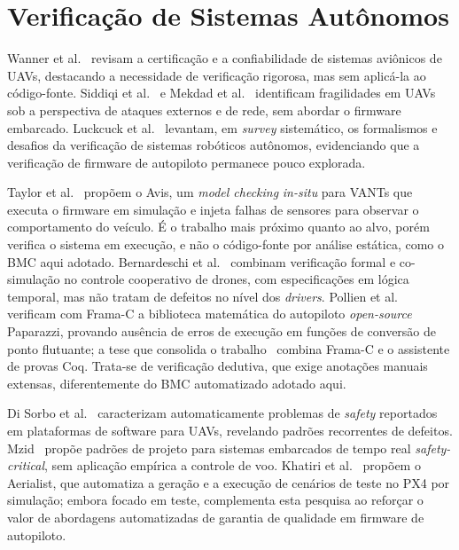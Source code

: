 \section{Verificação de Sistemas Autônomos}
\label{sec:rel-autonomos}

Wanner et al.~\cite{Wanner2024} revisam a certificação e a confiabilidade de
sistemas aviônicos de UAVs, destacando a necessidade de verificação rigorosa, mas
sem aplicá-la ao código-fonte. Siddiqi et al.~\cite{Siddiqi2022} e Mekdad et
al.~\cite{Mekdad2023} identificam fragilidades em UAVs sob a perspectiva de
ataques externos e de rede, sem abordar o firmware embarcado.
Luckcuck et al.~\cite{Luckcuck2019} levantam, em \textit{survey} sistemático, os
formalismos e desafios da verificação de sistemas robóticos autônomos,
evidenciando que a verificação de firmware de autopiloto permanece pouco
explorada.

Taylor et al.~\cite{Taylor2021} propõem o Avis, um \textit{model checking}
\textit{in-situ} para VANTs que executa o firmware em simulação e injeta falhas
de sensores para observar o comportamento do veículo. É o trabalho mais próximo
quanto ao alvo, porém verifica o sistema em execução, e não o código-fonte por
análise estática, como o BMC aqui adotado. Bernardeschi et
al.~\cite{Bernardeschi2023} combinam verificação formal e co-simulação no
controle cooperativo de drones, com especificações em lógica temporal, mas não
tratam de defeitos no nível dos \textit{drivers}. Pollien et
al.~\cite{Pollien2021} verificam com Frama-C a biblioteca matemática do
autopiloto \textit{open-source} Paparazzi, provando ausência de erros de execução
em funções de conversão de ponto flutuante; a tese que consolida o
trabalho~\cite{Pollien2023} combina Frama-C e o assistente de provas Coq. Trata-se
de verificação dedutiva, que exige anotações manuais extensas, diferentemente do
BMC automatizado adotado aqui.

Di Sorbo et al.~\cite{deSorbo2022} caracterizam automaticamente problemas de
\textit{safety} reportados em plataformas de software para UAVs, revelando
padrões recorrentes de defeitos. Mzid~\cite{Mzid2024} propõe padrões de projeto
para sistemas embarcados de tempo real \textit{safety-critical}, sem aplicação
empírica a controle de voo. Khatiri et al.~\cite{Khatiri2024} propõem o
Aerialist, que automatiza a geração e a execução de cenários de teste no PX4 por
simulação; embora focado em teste, complementa esta pesquisa ao reforçar o valor
de abordagens automatizadas de garantia de qualidade em firmware de autopiloto.

